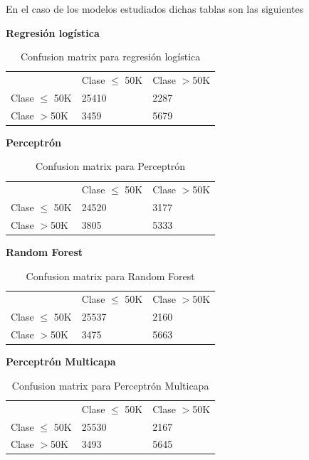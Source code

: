 \documentclass[11pt]{article}
\begin{document}
En el caso de los modelos estudiados dichas tablas son las siguientes

\textbf{Regresión logística}
\begin{table}[H]
\centering
\begin{tabular}{lll}
                          &          Clase $\leq$ 50K        &       Clase $>$50K                \\ \cline{2-3} 
\multicolumn{1}{l|}{Clase $\leq$ 50K} & \multicolumn{1}{l|}{25410} & \multicolumn{1}{l|}{2287} \\ \cline{2-3} 
\multicolumn{1}{l|}{Clase $>$50K } & \multicolumn{1}{l|}{3459} & \multicolumn{1}{l|}{5679} \\ \cline{2-3} 
\end{tabular}
\caption{Confusion matrix para regresión logística}
\end{table}

\textbf{Perceptrón}
\begin{table}[H]
\centering
\begin{tabular}{lll}
                          &          Clase $\leq$ 50K        &       Clase $>$50K                \\ \cline{2-3} 
\multicolumn{1}{l|}{Clase $\leq$ 50K} & \multicolumn{1}{l|}{24520} & \multicolumn{1}{l|}{3177} \\ \cline{2-3} 
\multicolumn{1}{l|}{Clase $>$50K } & \multicolumn{1}{l|}{3805} & \multicolumn{1}{l|}{5333} \\ \cline{2-3} 
\end{tabular}
\caption{Confusion matrix para Perceptrón}
\end{table}

\textbf{Random Forest}
\begin{table}[H]
\centering
\begin{tabular}{lll}
                          &          Clase $\leq$ 50K        &       Clase $>$50K                \\ \cline{2-3} 
\multicolumn{1}{l|}{Clase $\leq$ 50K} & \multicolumn{1}{l|}{25537} & \multicolumn{1}{l|}{2160} \\ \cline{2-3} 
\multicolumn{1}{l|}{Clase $>$50K } & \multicolumn{1}{l|}{3475} & \multicolumn{1}{l|}{5663} \\ \cline{2-3} 
\end{tabular}
\caption{Confusion matrix para Random Forest}
\end{table}

\textbf{Perceptrón Multicapa}
\begin{table}[H]
\centering
\begin{tabular}{lll}
                          &          Clase $\leq$ 50K        &       Clase $>$50K                \\ \cline{2-3} 
\multicolumn{1}{l|}{Clase $\leq$ 50K} & \multicolumn{1}{l|}{25530} & \multicolumn{1}{l|}{2167} \\ \cline{2-3} 
\multicolumn{1}{l|}{Clase $>$50K } & \multicolumn{1}{l|}{3493} & \multicolumn{1}{l|}{5645} \\ \cline{2-3} 
\end{tabular}
\caption{Confusion matrix para Perceptrón Multicapa}
\end{table}
\end{document}
